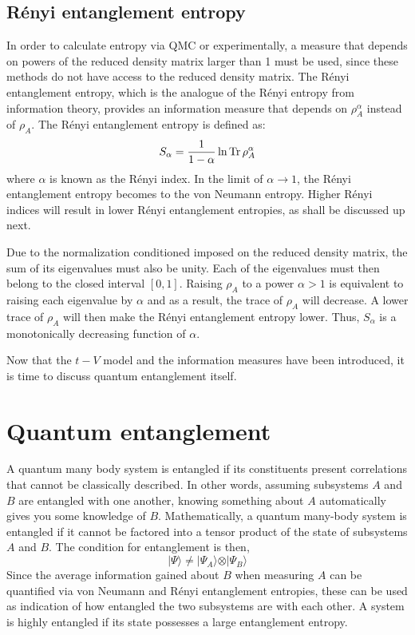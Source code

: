 	\subsection{R\'enyi entanglement entropy}
	
	In order to calculate entropy via QMC or experimentally, a measure that depends on powers of the reduced density matrix larger than 1 must be used, since these methods do not have access to the reduced density matrix. The R\'enyi entanglement entropy, which is the analogue of the R\'enyi entropy from information theory, provides an information measure that depends on $\rho_{A}^{\alpha}$ instead of $\rho_{A}$. The R\'enyi entanglement entropy is defined as:
	\begin{equation}
	\label{eq: renyiEE}
	S_{\alpha} = \frac{1}{1-\alpha} \ln \operatorname{Tr} \rho_{A}^{\alpha}
	\end{equation}
	where $\alpha$ is known as the R\'enyi index. In the limit of $\alpha \to 1$, the R\'enyi entanglement entropy becomes to the von Neumann entropy. Higher R\'enyi indices will result in lower R\'enyi entanglement entropies, as shall be discussed up next.
	
	Due to the normalization conditioned imposed on the reduced density matrix, the sum of its eigenvalues must also be unity. Each of the eigenvalues must then belong to the closed interval $\left [ 0,1 \right ]$. Raising $\rho_A$ to a power $\alpha > 1$ is equivalent to raising each eigenvalue by $\alpha$ and as a result, the trace of $\rho_A$ will decrease. A lower trace of $\rho_A$ will then make the R\'enyi entanglement entropy lower. Thus, $S_{\alpha}$ is a monotonically decreasing function of $\alpha$. 
	
	Now that the $t-V$ model and the information measures have been introduced, it is time to discuss quantum entanglement itself.
	
\section{Quantum entanglement}
\label{sec:quantumEntanglement}

	A quantum many body system is entangled if its constituents present correlations that cannot be classically described. In other words, assuming subsystems $A$ and $B$ are entangled with one another, knowing something about $A$ automatically gives you some knowledge of $B$. 	Mathematically, a quantum many-body system is entangled if it cannot be factored into a tensor product of the state of subsystems $A$ and $B$. The condition for entanglement is then,
%	
	\begin{equation}
	\vert\Psi\rangle \neq \vert\Psi_{A}\rangle \otimes \vert\Psi_{B}\rangle
	\label{eq:entanglementCondition}
	\end{equation}
%
	Since the average information gained about $B$ when measuring $A$ can be quantified via von Neumann and R\'enyi entanglement entropies, these can be used as indication of how entangled the two subsystems are with each other. A system is highly entangled if its state possesses a large entanglement entropy.
	
